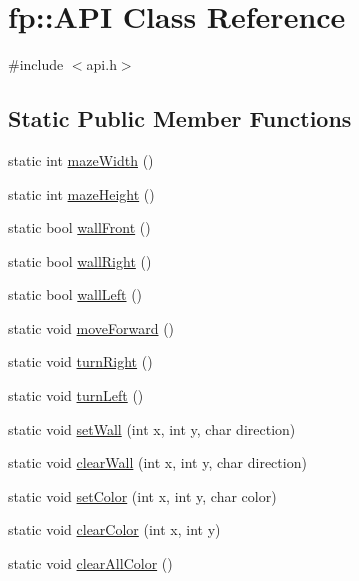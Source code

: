 \hypertarget{classfp_1_1_a_p_i}{}\section{fp\+:\+:A\+PI Class Reference}
\label{classfp_1_1_a_p_i}


{\ttfamily \#include $<$api.\+h$>$}

\subsection*{Static Public Member Functions}
\begin{DoxyCompactItemize}
\item 
static int \hyperlink{classfp_1_1_a_p_i_af8adb8d6fe6b921de4172111b32fc710}{maze\+Width} ()
\item 
static int \hyperlink{classfp_1_1_a_p_i_a7d9285544497a39f87e841fcfe49deab}{maze\+Height} ()
\item 
static bool \hyperlink{classfp_1_1_a_p_i_a52c23ca6b94cd561727e63c4a568bb86}{wall\+Front} ()
\item 
static bool \hyperlink{classfp_1_1_a_p_i_aeaebbd3b022bc0ed768dc3112ea1db94}{wall\+Right} ()
\item 
static bool \hyperlink{classfp_1_1_a_p_i_a49efec34a5521b6a7f202759f7f758d2}{wall\+Left} ()
\item 
static void \hyperlink{classfp_1_1_a_p_i_a4863c0dec23d677c5eefb7c03088b29c}{move\+Forward} ()
\item 
static void \hyperlink{classfp_1_1_a_p_i_ac346f1c3ae7a39829c16681be2f25e92}{turn\+Right} ()
\item 
static void \hyperlink{classfp_1_1_a_p_i_aacf09d263f8c47e7f3eae1f348db0b91}{turn\+Left} ()
\item 
static void \hyperlink{classfp_1_1_a_p_i_a5f209e53ce63ad478bb67b120b34c7dd}{set\+Wall} (int x, int y, char direction)
\item 
static void \hyperlink{classfp_1_1_a_p_i_a19710a245ad8c075066046617ea3377b}{clear\+Wall} (int x, int y, char direction)
\item 
static void \hyperlink{classfp_1_1_a_p_i_a5a7c59cffb4ca483e8c1334a99a04dbb}{set\+Color} (int x, int y, char color)
\item 
static void \hyperlink{classfp_1_1_a_p_i_a5ab1560f68fb54993c8b3316177040a5}{clear\+Color} (int x, int y)
\item 
static void \hyperlink{classfp_1_1_a_p_i_a68f86debe50e6e2ae0c1fde795a1cfb6}{clear\+All\+Color} ()
\item 

\end{DoxyCompactItemize}

